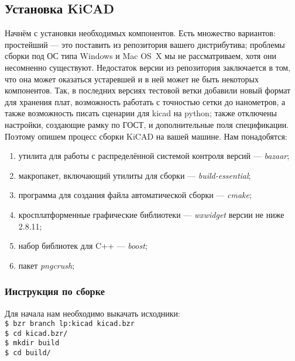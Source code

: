 \subsection{Установка KiCAD} 
Начнём с установки необходимых компонентов. Есть множество вариантов: простейший --- это поставить из репозитория вашего дистрибутива; проблемы сборки под ОС типа Windows и Mac OS~X  мы не рассматриваем, хотя они несомненно существуют. Недостаток версии из репозитория заключается в том, что она может оказаться устаревшей и в ней может не быть некоторых компонентов.
Так, в последних версиях тестовой ветки добавили новый формат для хранения плат, возможность работать с точностью сетки до нанометров, а также возможность писать сценарии для kicad на python; также отключены настройки, создающие рамку по ГОСТ, и дополнительные поля спецификации.
Поэтому опишем процесс сборки KiCAD на вашей машине. Нам понадобятся:
\begin{enumerate}
 \item утилита для работы с распределённой системой контроля версий --- \emph{bazaar};
 \item макропакет, включающий утилиты для сборки --- \emph{build-essential};
 \item программа для создания файла автоматической сборки --- \emph{cmake};
 \item кросплатформенные графические библиотеки --- \emph{wxwidget} версии не ниже 2.8.11;
 \item набор библиотек для C++ --- \emph{boost};
 \item пакет \emph{pngcrush};
\end{enumerate}

\subsubsection{Инструкция по сборке}
Для начала нам необходимо выкачать исходники:\\
\texttt{\$ bzr branch lp:kicad kicad.bzr}\\
\texttt{\$ cd kicad.bzr/}\\
\texttt{\$ mkdir build}\\
\texttt{\$ cd build/}\\

